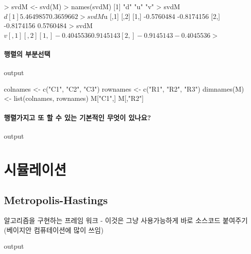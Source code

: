 \documentclass{report}
\begin{document}
\begin{Schunk}
\begin{Soutput}
> svdM <- svd(M)
> names(svdM)
[1] "d" "u" "v"
> svdM$d
[1] 5.4649857 0.3659662
> svdM$u
           [,1]       [,2]
[1,] -0.5760484 -0.8174156
[2,] -0.8174156  0.5760484
> svdM$v
           [,1]       [,2]
[1,] -0.4045536  0.9145143
[2,] -0.9145143 -0.4045536
> $
\end{Soutput}
\end{Schunk}

\paragraph{행렬의 부분선택}
\begin{Schunk}
\begin{Soutput}
output
\end{Soutput}
\end{Schunk}



\begin{Schunk}
\begin{Soutput}
colnames <- c("C1", "C2", "C3")
rownames <- c("R1", "R2", "R3")
dimnames(M) <- list(colnames, rownames)
M["C1",]
M[,"R2"]

\end{Soutput}
\end{Schunk}

\paragraph{행렬가지고 또 할 수 있는 기본적인 무엇이 있나요?}
\begin{Schunk}
\begin{Soutput}
output
\end{Soutput}
\end{Schunk}


\section{시뮬레이션}
\subsection{Metropolis-Hastings} 알고리즘을 구현하는 프레임 워크 - 이것은 그냥 사용가능하게 바로 소스코드 붙여주기 (베이지안 컴퓨테이션에 많이 쓰임)
\begin{Schunk}
\begin{Soutput}
output
\end{Soutput}
\end{Schunk}
\end{document}
